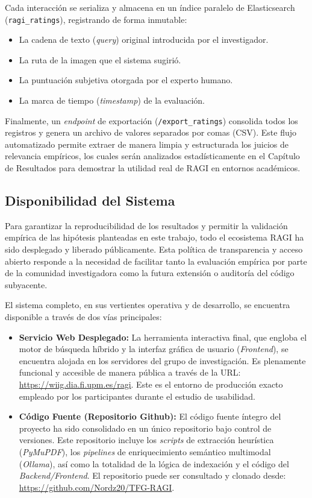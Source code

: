 \documentclass[a4paper]{report}
\begin{document}
Cada interacción se serializa y almacena en un índice paralelo de Elasticsearch (\texttt{ragi\_ratings}), registrando de forma inmutable:
\begin{itemize}
    \item La cadena de texto (\textit{query}) original introducida por el investigador.
    \item La ruta de la imagen que el sistema sugirió.
    \item La puntuación subjetiva otorgada por el experto humano.
    \item La marca de tiempo (\textit{timestamp}) de la evaluación.
\end{itemize}

Finalmente, un \textit{endpoint} de exportación (\texttt{/export\_ratings}) consolida todos los registros y genera un archivo de valores separados por comas (CSV). Este flujo automatizado permite extraer de manera limpia y estructurada los juicios de relevancia empíricos, los cuales serán analizados estadísticamente en el Capítulo de Resultados para demostrar la utilidad real de RAGI en entornos académicos.

\subsection{Disponibilidad del Sistema}
\label{subsec:disponibilidad}

Para garantizar la reproducibilidad de los resultados y permitir la validación empírica de las hipótesis planteadas en este trabajo, todo el ecosistema RAGI ha sido desplegado y liberado públicamente. Esta política de transparencia y acceso abierto responde a la necesidad de facilitar tanto la evaluación empírica por parte de la comunidad investigadora como la futura extensión o auditoría del código subyacente.

El sistema completo, en sus vertientes operativa y de desarrollo, se encuentra disponible a través de dos vías principales:

\begin{itemize}
    \item \textbf{Servicio Web Desplegado:} La herramienta interactiva final, que engloba el motor de búsqueda híbrido y la interfaz gráfica de usuario (\textit{Frontend}), se encuentra alojada en los servidores del grupo de investigación. Es plenamente funcional y accesible de manera pública a través de la URL: \url{https://wiig.dia.fi.upm.es/ragi}. Este es el entorno de producción exacto empleado por los participantes durante el estudio de usabilidad.
    
    \item \textbf{Código Fuente (Repositorio Github):} El código fuente íntegro del proyecto ha sido consolidado en un único repositorio bajo control de versiones. Este repositorio incluye los \textit{scripts} de extracción heurística (\textit{PyMuPDF}), los \textit{pipelines} de enriquecimiento semántico multimodal (\textit{Ollama}), así como la totalidad de la lógica de indexación y el código del \textit{Backend/Frontend}. El repositorio puede ser consultado y clonado desde: \url{https://github.com/Nordz20/TFG-RAGI}.
\end{itemize}
\end{document}
